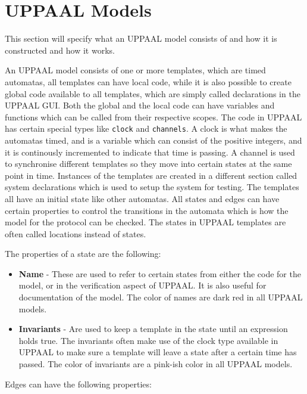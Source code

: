 \section{UPPAAL Models}
This section will specify what an UPPAAL model consists of and how it is constructed and how it works.

An UPPAAL model consists of one or more templates, which are timed automatas, all templates can have local code, while it is also possible to create global code available to all templates, which are simply called declarations in the UPPAAL GUI.
Both the global and the local code can have variables and functions which can be called from their respective scopes.
The code in UPPAAL has certain special types like \texttt{clock} and \texttt{channels}.
A clock is what makes the automatas timed, and is a variable which can consist of the positive integers, and it is continously incremented to indicate that time is passing.
A channel is used to synchronise different templates so they move into certain states at the same point in time.
Instances of the templates are created in a different section called system declarations which is used to setup the system for testing.
The templates all have an initial state like other automatas.
All states and edges can have certain properties to control the transitions in the automata which is how the model for the protocol can be checked.
The states in UPPAAL templates are often called locations instead of states.

The properties of a state are the following: 

\begin{itemize}
	\item \textbf{Name} - These are used to refer to certain states from either the code for the model, or in the verification aspect of UPPAAL. It is also useful for documentation of the model. The color of names are dark red in all UPPAAL models.
	\item \textbf{Invariants} - Are used to keep a template in the state until an expression holds true. The invariants often make use of the clock type available in UPPAAL to make sure a template will leave a state after a certain time has passed. The color of invariants are a pink-ish color in all UPPAAL models.
\end{itemize}

Edges can have the following properties:

